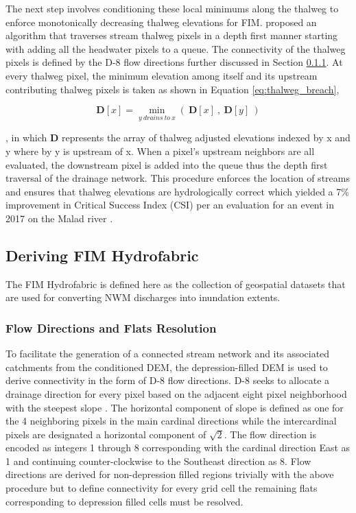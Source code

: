 \documentclass[draft]{dependencies/agujournal2019}
\begin{document}
The next step involves conditioning these local minimums along the thalweg to enforce monotonically decreasing thalweg elevations for FIM.
 proposed an algorithm that traverses stream thalweg pixels in a depth first manner starting with adding all the headwater pixels to a queue. 
The connectivity of the thalweg pixels is defined by the D-8 flow directions further discussed in Section \ref{ssec:flow_direction_and_flat_resolution}.
At every thalweg pixel, the minimum elevation among itself and its upstream contributing thalweg pixels is taken as shown in Equation \ref{eq:thalweg_breach},
%
\begin{linenomath*}
\begin{equation}
\label{eq:thalweg_breach}
\textbf{D}[x] = \min_{y\ drains\ to\ x} {(\ \textbf{D}[x]\ ,\ \textbf{D}[y]\ )}
\end{equation}
\end{linenomath*}
%
, in which \textbf{D} represents the array of thalweg adjusted elevations indexed by x and y where by y is upstream of x. 
When a pixel's upstream neighbors are all evaluated, the downstream pixel is added into the queue thus the depth first traversal of the drainage network.
This procedure enforces the location of streams and ensures that thalweg elevations are hydrologically correct which yielded a 7\% improvement in Critical Success Index (CSI) per an evaluation for an event in 2017 on the Malad river \cite{garousi2019terrain}.
%
\subsection{Deriving FIM Hydrofabric}
\label{ssec:deriving_fim_hydrofabric}
%
The FIM Hydrofabric is defined here as the collection of geospatial datasets that are used for converting NWM discharges into inundation extents.
%
\subsubsection{Flow Directions and Flats Resolution}
\label{ssec:flow_direction_and_flat_resolution}
%
To facilitate the generation of a connected stream network and its associated catchments from the conditioned DEM, the depression-filled DEM is used to derive connectivity in the form of D-8 flow directions.
D-8 seeks to allocate a drainage direction for every pixel based on the adjacent eight pixel neighborhood with the steepest slope \cite{o1984extraction}.
The horizontal component of slope is defined as one for the 4 neighboring pixels in the main cardinal directions while the intercardinal pixels are designated a horizontal component of $\sqrt{2}$. 
The flow direction is encoded as integers 1 through 8 corresponding with the cardinal direction East as 1 and continuing counter-clockwise to the Southeast direction as 8. 
Flow directions are derived for non-depression filled regions trivially with the above procedure but to define connectivity for every grid cell the remaining flats corresponding to depression filled cells must be resolved.
\end{document}
